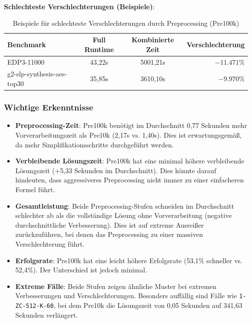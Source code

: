 \textbf{Schlechteste Verschlechterungen (Beispiele)}:
\begin{table}[H]
    \centering
    \begin{tabular}{lccr}
        \toprule
        \textbf{Benchmark} & \textbf{Full Runtime} & \textbf{Kombinierte Zeit} & \textbf{Verschlechterung} \\
        \midrule
        EDP3-11000 & 43,22s & 5001,21s & $-11.471\%$ \\
        \midrule
        g2-slp-synthesis-aes-top30 & 35,85s & 3610,10s & $-9.970\%$ \\
        \bottomrule
    \end{tabular}
    \caption{Beispiele für schlechteste Verschlechterungen durch Preprocessing (Pre100k)}\label{tab:worst_degradations_pre100k}
\end{table}

\subsubsection{Wichtige Erkenntnisse}

\begin{itemize}
    \setlength{\itemsep}{2pt}
    \item \textbf{Preprocessing-Zeit}: Pre100k benötigt im Durchschnitt 0,77 Sekunden mehr Vorverarbeitungszeit als Pre10k (2,17s vs. 1,40s). Dies ist erwartungsgemäß, da mehr Simplifikationsschritte durchgeführt werden.
    
    \item \textbf{Verbleibende Lösungszeit}: Pre100k hat eine minimal höhere verbleibende Lösungszeit (+5,33 Sekunden im Durchschnitt). Dies könnte darauf hindeuten, dass aggressiveres Preprocessing nicht immer zu einer einfacheren Formel führt.
    
    \item \textbf{Gesamtleistung}: Beide Preprocessing-Stufen schneiden im Durchschnitt schlechter ab als die vollständige Lösung ohne Vorverarbeitung (negative durchschnittliche Verbesserung). Dies ist auf extreme Ausreißer zurückzuführen, bei denen das Preprocessing zu einer massiven Verschlechterung führt.
    
    \item \textbf{Erfolgsrate}: Pre100k hat eine leicht höhere Erfolgsrate (53,1\% schneller vs. 52,4\%). Der Unterschied ist jedoch minimal.
    
    \item \textbf{Extreme Fälle}: Beide Stufen zeigen ähnliche Muster bei extremen Verbesserungen und Verschlechterungen. Besonders auffällig sind Fälle wie \texttt{1-ZC-512-K-60}, bei dem Pre10k die Lösungszeit von 0,05 Sekunden auf 341,63 Sekunden verlängert.
\end{itemize}

